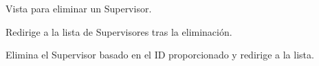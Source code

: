 \documentclass[letterpaper,10pt,spanish]{sphinxmanual}
\begin{document}
\begin{fulllineitems}

\pysigstartsignatures
{}
\pysigstopsignatures
\sphinxAtStartPar
Vista para eliminar un Supervisor.

\sphinxAtStartPar
Redirige a la lista de Supervisores tras la eliminación.


\begin{fulllineitems}

\pysigstartsignatures
{}
\pysigstopsignatures
\sphinxAtStartPar
Elimina el Supervisor basado en el ID proporcionado y redirige a la lista.

\end{fulllineitems}


\end{fulllineitems}
\end{document}
